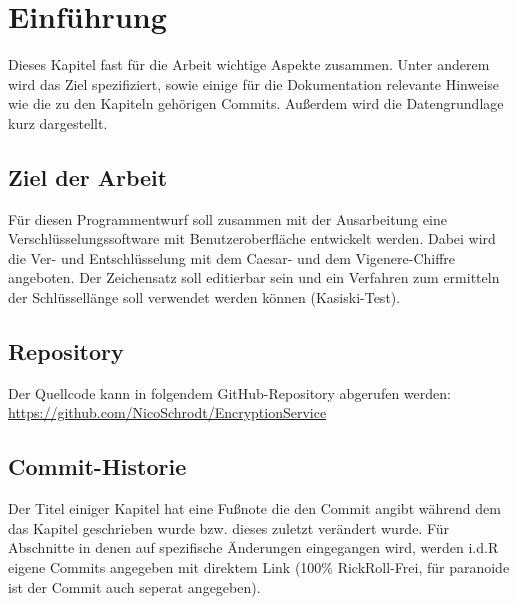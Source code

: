 \documentclass[12pt]{article}
\begin{document}
\clearpairofpagestyles
\clearmainofpairofpagestyles

\ihead[]{\leftmark} %

\cfoot[\pagemark]{\pagemark} %



\section{Einführung}
Dieses Kapitel fast für die Arbeit wichtige Aspekte zusammen. Unter anderem wird das Ziel spezifiziert, sowie einige für die Dokumentation relevante Hinweise wie die zu den Kapiteln gehörigen Commits. Außerdem wird die Datengrundlage kurz dargestellt.

\subsection{Ziel der Arbeit}
Für diesen Programmentwurf soll zusammen mit der Ausarbeitung eine Verschlüsselungssoftware mit Benutzeroberfläche entwickelt werden. Dabei wird die Ver- und Entschlüsselung mit dem Caesar- und dem Vigenere-Chiffre angeboten. Der Zeichensatz soll editierbar sein und ein Verfahren zum ermitteln der Schlüssellänge soll verwendet werden können (Kasiski-Test).

\subsection{Repository}
Der Quellcode kann in folgendem GitHub-Repository abgerufen werden:\\ \url{https://github.com/NicoSchrodt/EncryptionService}

\subsection{Commit-Historie}
Der Titel einiger Kapitel hat eine Fußnote die den Commit angibt während dem das Kapitel geschrieben wurde bzw. dieses zuletzt verändert wurde. Für Abschnitte in denen auf spezifische Änderungen eingegangen wird, werden i.d.R eigene Commits angegeben mit direktem Link (100\% RickRoll-Frei, für paranoide ist der Commit auch seperat angegeben).
\end{document}
